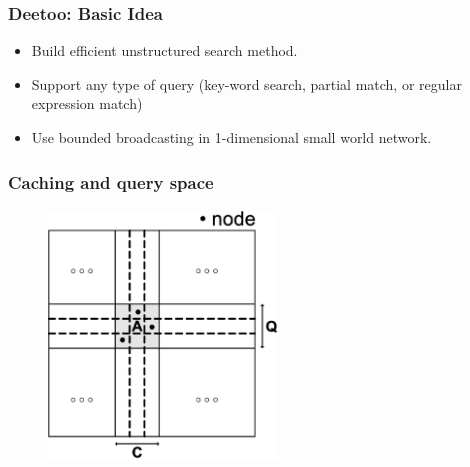 \documentclass[red]{beamer}
\begin{document}

\begin{frame}
\frametitle{Deetoo: Basic Idea}
\begin{itemize}
\item
Build efficient unstructured search method.
\item
Support any type of query (key-word search, partial match, or regular expression match)
\item
Use bounded broadcasting in 1-dimensional small world network.
\end{itemize}
\end{frame}

\begin{frame}
\frametitle{Caching and query space}
\begin{figure}
\centering
\includegraphics[width=2.4in]{figs/space}
\end{figure}
\end{frame}
\end{document}
